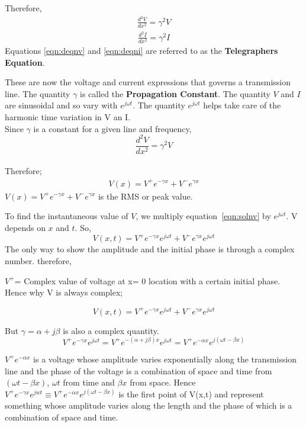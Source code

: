 Therefore, 
\begin{align}
\frac{d^{2}V}{dx^{2}} = \gamma^{2}V 
\label{eqn:deqnv}
\end{align}
\begin{align}
\frac{d^{2}I}{dx^{2}} = \gamma^{2}I 
\label{eqn:deqni}
\end{align}
Equations \ref{eqn:deqnv} and \ref{eqn:deqni} are referred to as the \textbf{Telegraphers Equation}.

These are now the voltage and current expressions that governs a transmission line. The quantity $ \gamma $ is called the \textbf{Propagation Constant}. The quantity $V$ and $I$ are sinusoidal and so vary with $ e ^{j\omega t}$. The quantity $ e ^{j\omega t} $ helps take care of the harmonic time variation in V an I. \\
Since $ \gamma $ is a constant for a given line and frequency, 
\[ \frac{d^{2}V}{dx^{2}} = \gamma^{2}V\]\\
Therefore; 
\begin{align}
V(x) = V^{+} e ^{- \gamma x} + V^{-}e^{\gamma x}  
\label{eqn:solnv}
\end{align}
$ 	V(x) = V^{+} e ^{- \gamma x} + V^{-}e^{\gamma x} $  is the RMS or peak value. 

To find the instantaneous value of $V$, we multiply equation~\ref{eqn:solnv} by $ e ^{j\omega t}$.  V depends on $x$ and $t$. So,
\[ 	V(x,t) = V^{+} e^{-\gamma x}e^{j\omega t} + V^{-} e^{\gamma x}e^{j\omega t} \]
The only way to show the amplitude and the initial phase is through a complex number. therefore,

$ V^{+} $= Complex value of voltage at x= 0 location with a certain initial phase. Hence why V is always complex;

\[ 	V(x,t) = V^{+} e^{-\gamma x}e^{j\omega t} + V^{-} e^{\gamma x}e^{j\omega t} \]

But $ \gamma = \alpha + j\beta $	 is also a complex quantity. 
\[ V^{+}e^{- \gamma x}e^{j \omega t} = V^{+}e^{-( \alpha + j \beta )x}e^{j \omega t} = V^{+}e^{-\alpha x}e^{j(\omega t - \beta x)}
 \]

$ V^{+}e^{-\alpha x} $ is a voltage whose amplitude varies exponentially along the transmission line and the phase of the voltage is a combination of space and time from $  (\omega t- \beta x) $, $ \omega t $ from time and $ \beta x  $ from space. Hence $ V^{+}e^{-\gamma x}e^{jwt} \equiv V^{+}e^{-\alpha x}e^{j( \omega t-\beta x)} $ is the first point of V(x,t) and represent something whose amplitude varies along the length and the phase of which is a combination of space and time.\\

